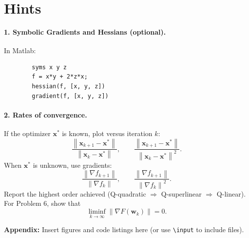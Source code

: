 \documentclass[11pt]{article}
\newcommand{\vect}[1]{\mathbf{#1}}
\newcommand{\norm}[1]{\left\lVert #1 \right\rVert}
\begin{document}
	\section*{Hints}
	
	\paragraph{1. Symbolic Gradients and Hessians (optional).}
	In Matlab:
	\begin{verbatim}
		syms x y z
		f = x*y + 2*z*x;
		hessian(f, [x, y, z])
		gradient(f, [x, y, z])
	\end{verbatim}
	
	\paragraph{2. Rates of convergence.}
	If the optimizer $\vect{x}^\ast$ is known, plot versus iteration $k$:
	\[
	\frac{\norm{\vect{x}_{k+1}-\vect{x}^\ast}}{\norm{\vect{x}_k-\vect{x}^\ast}},
	\qquad
	\frac{\norm{\vect{x}_{k+1}-\vect{x}^\ast}}{\norm{\vect{x}_k-\vect{x}^\ast}^2}.
	\]
	When $\vect{x}^\ast$ is unknown, use gradients:
	\[
	\frac{\norm{\nabla f_{k+1}}}{\norm{\nabla f_k}},
	\qquad
	\frac{\norm{\nabla f_{k+1}}}{\norm{\nabla f_k}^2}.
	\]
	Report the highest order achieved (Q-quadratic $\Rightarrow$ Q-superlinear $\Rightarrow$ Q-linear). For Problem 6, show that
	\[
	\liminf_{k\to\infty}\norm{\nabla F(\vect{w}_k)}=0.
	\]
	
	\vfill
	\noindent\textbf{Appendix:} Insert figures and code listings here (or use \texttt{\textbackslash input} to include files).
	
\end{document}
